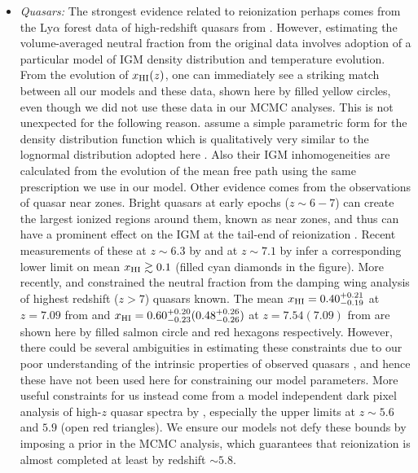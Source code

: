\documentclass[useAMS,usenatbib]{mnras}
\begin{document}
\begin{itemize}
 \item {\it Quasars:} The strongest evidence related to reionization perhaps comes from the Ly$\alpha$ forest
 data of high-redshift quasars from \cite{2006AJ....132..117F}. However, estimating
 the volume-averaged neutral fraction from the original data involves adoption of a particular model of
 IGM density distribution and temperature evolution. From the evolution of $x_{\rm HI}(z)$,
 one can immediately see a striking match between all our models and these data,
 shown here by filled yellow circles, even though we did not use these data in 
 our MCMC analyses.
 This is not unexpected for the following reason. \cite{2006AJ....132..117F} 
 assume a simple parametric form for the density distribution function \citep{2000ApJ...530....1M}
 which is qualitatively very similar to the lognormal 
 distribution adopted here \citep{mitra4}. Also their IGM inhomogeneities
 are calculated from the evolution of the mean free path using the 
 same \citet{2000ApJ...530....1M} prescription we use in our model.
 Other evidence comes from the observations of quasar near zones.
 Bright quasars at early epochs ($z\sim6-7$) can create the largest ionized regions around them, known as
 near zones, and thus can have a prominent effect on the IGM at the tail-end 
 of reionization \citep{2007MNRAS.381L..35B,2010ApJ...714..834C,2014MNRAS.443.3761P}. Recent measurements of these
 at $z\sim6.3$ by \cite{2013MNRAS.428.3058S} and at $z\sim7.1$ by \cite{2011MNRAS.416L..70B} infer
 a corresponding lower limit on mean $x_{\rm HI}\gtrsim0.1$ (filled cyan diamonds in the figure).
 More recently, \cite{2017MNRAS.466.4239G} and \cite{2018arXiv180206066D} constrained the neutral
 fraction from the damping wing analysis of highest redshift ($z>7$) quasars known. The mean $x_{\rm HI}=0.40^{+0.21 }_{-0.19}$
 at $z=7.09$ from \cite{2017MNRAS.466.4239G} and $x_{\rm HI}=0.60^{+0.20}_{-0.23} (0.48^{+0.26}_{-0.26})$
 at $z=7.54 (7.09)$ from \cite{2018arXiv180206066D} are shown here by filled salmon circle
 and red hexagons respectively. However, there
 could be several ambiguities in estimating these constraints due to our poor understanding of the intrinsic
 properties of observed quasars \citep{2007MNRAS.374..493B,2007MNRAS.376L..34M}, and hence these have
 not been used here for constraining our model parameters.
 More useful constraints for us instead
 come from a model independent dark pixel analysis of high-$z$ quasar spectra by \cite{2015MNRAS.447..499M},
 especially the upper limits at $z\sim5.6$ and $5.9$ (open red triangles). We ensure our models not
 defy these bounds by imposing a prior in the MCMC analysis, which guarantees 
 that reionization is almost completed at least by redshift $\sim5.8$.
 

\end{itemize}
\end{document}
